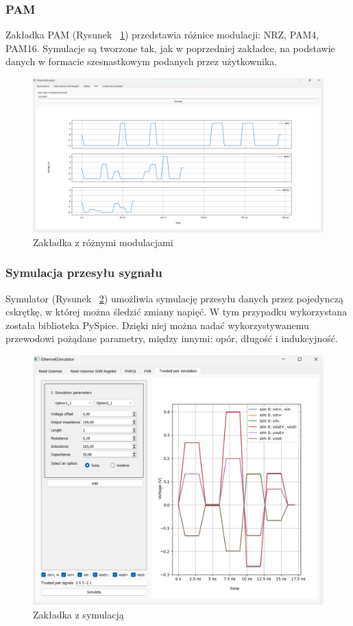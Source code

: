 \subsubsection{PAM}

Zakładka PAM (Rysunek ~\ref{fig:pam_sim_png}) przedstawia różnice modulacji: NRZ, PAM4, PAM16. Symulacje są tworzone tak, jak w poprzedniej zakładce, na podstawie danych w formacie szesnastkowym podanych przez użytkownika.

\begin{figure}[H]
    \centering
    \includegraphics[width=\textwidth]{images/pam_tab.png}
    \caption{Zakładka z różnymi modulacjami}
    \label{fig:pam_sim_png}
\end{figure}

\subsubsection{Symulacja przesyłu sygnału}
Symulator (Rysunek ~\ref{fig:sim_png}) umożliwia symulację przesyłu danych przez pojedynczą cskrętkę, w której można śledzić zmiany napięć. W tym przypadku wykorzystana została biblioteka PySpice. Dzięki niej można nadać wykorzystywanemu przewodowi pożądane parametry, między innymi: opór, długość i indukcyjność.

\begin{figure}[H]
    \centering
    \includegraphics[width=\textwidth]{images/sim.png}
    \caption{Zakładka z symulacją}
    \label{fig:sim_png}
\end{figure}

